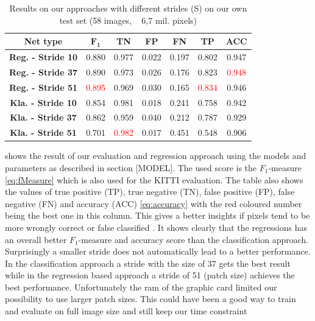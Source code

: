 \begin{table}[]
	\begin{center}
		\begin{tabular}{c|cccccc}
			\toprule
			\textbf{Net type} & {\bf $\mathbf{F_1}$} & \textbf{TN} & \textbf{FP} & \textbf{FN} & \textbf{TP} & \textbf{ACC} \\
			\midrule
			\textbf{Reg. - Stride 10} & 0.880 & 0.977 & 0.022 & 0.197 & 0.802 & 0.947\\
			\textbf{Reg. - Stride 37} & 0.890 & 0.973 & 0.026 & 0.176 & 0.823 &  \textcolor{red}{0.948}\\
			\textbf{Reg. - Stride 51} & \textcolor{red}{0.895} & 0.969 & 0.030 & 0.165 & \textcolor{red}{0.834} & 0.946\\
			\midrule
			\textbf{Kla. - Stride 10} & 0.854 & 0.981 & 0.018 & 0.241 & 0.758 & 0.942\\
			\textbf{Kla. - Stride 37} & 0.862 & 0.959 & 0.040 & 0.212 & 0.787 & 0.929\\
			\textbf{Kla. - Stride 51} & 0.701 & \textcolor{red}{0.982} & 0.017 & 0.451 & 0.548 & 0.906\\
			\bottomrule
		\end{tabular}
		\caption{Results on our approaches with different strides (S) on our own test set (58 images, ~ 6,7 mil. pixels)}
		\label{tab:ownapproach}
	\end{center}
\end{table}

 shows the result of our evaluation and regression approach using the models and parameters as described in section [MODEL]. The used score is the $F_1$-measure \ref{eq:fMeasure} which is also used for the KITTI evaluation.
The table also shows the values of true positive (TP), true negative (TN), false positive (FP), false negative (FN) and accuracy (ACC) \ref{eq:accuracy} with the red coloured number being the best one in this column. This gives a better insights if pixels tend to be more wrongly correct or false classified . It shows clearly that the regressions has an overall better $F_1$-measure and accuracy score than the classification approach. Surprisingly a smaller stride does not automatically lead to a better performance. In the classification approach a stride with the size of 37 gets the best result while in the regression based approach a stride of 51 (patch size) achieves the best performance. Unfortunately the ram of the graphic card limited our possibility to use larger patch sizes. This could have been a good way to train and evaluate on full image size and still keep our time constraint\\

